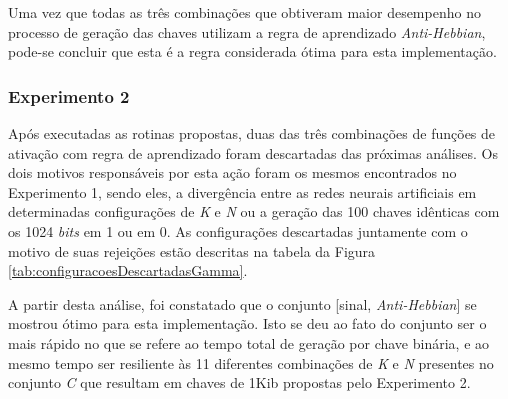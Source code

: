 \documentclass[a4paper,10pt,oneside,conference,final,keeplastbox]{inatel}
\newcommand{\bits}{\textit{bits}\xspace}
\begin{document}
                Uma vez que todas as três combinações que obtiveram maior desempenho no processo de geração das chaves utilizam a regra de aprendizado \textit{Anti-Hebbian}, pode-se concluir que esta é a regra considerada ótima para esta implementação.
            
            \subsubsection{Experimento 2}
            \label{subsubsec:experimentoGamma}
            
                Após executadas as rotinas propostas, duas das três combinações de funções de ativação com regra de aprendizado foram descartadas das próximas análises. Os dois motivos responsáveis por esta ação foram os mesmos encontrados no Experimento 1, sendo eles, a divergência entre as redes neurais artificiais em determinadas configurações de \textit{K} e \textit{N} ou a geração das 100 chaves idênticas com os 1024 \bits em 1 ou em 0. As configurações descartadas juntamente com o motivo de suas rejeições estão descritas na tabela da Figura \ref{tab:configuracoesDescartadasGamma}.
                
                
                
                
                A partir desta análise, foi constatado que o conjunto [sinal, \textit{Anti-Hebbian}] se mostrou ótimo para esta implementação. Isto se deu ao fato do conjunto ser o mais rápido no que se refere ao tempo total de geração por chave binária, e ao mesmo tempo ser resiliente às 11 diferentes combinações de \textit{K} e \textit{N} presentes no conjunto \textit{C} que resultam em chaves de 1Kib propostas pelo Experimento 2.
                
\end{document}
